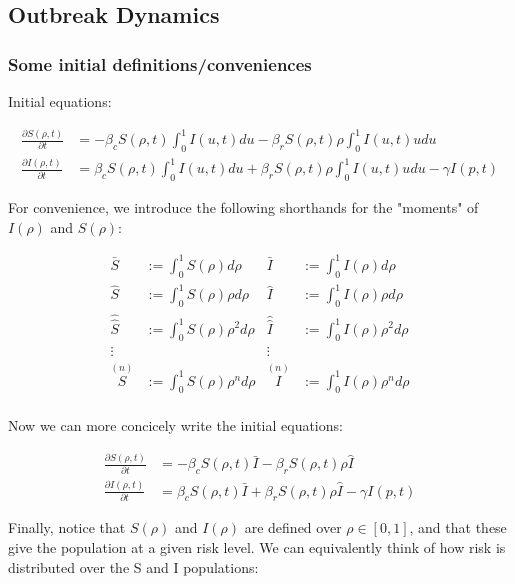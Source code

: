 \documentclass{article}
\begin{document}
{\subsection{Outbreak Dynamics}

\subsubsection{Some initial definitions/conveniences}

Initial equations:


\begin{align*}
\frac{\partial S(\rho, t)}{\partial t} &=
	-\beta_c S(\rho, t) \int_{0}^1 I(u, t) du
	-\beta_r S(\rho, t) \rho \int_{0}^1 I(u, t) u du\\
\frac{\partial I(\rho, t)}{\partial t} &=
	\beta_c S(\rho, t) \int_{0}^1 I(u, t) du
	+ \beta_r S(\rho, t) \rho \int_{0}^1 I(u, t) u du - \gamma I(p, t)
\end{align*}


For convenience, we introduce the following shorthands 
for the "moments" of $I(\rho)$ and $S(\rho)$:


\begin{align*}
\bar S &:= \int_{0}^{1} S(\rho) d\rho
	& \bar I &:= \int_{0}^{1} I(\rho) d\rho\\
\hat S &:= \int_{0}^{1} S(\rho) \rho d\rho
	& \hat I &:= \int_{0}^{1} I(\rho) \rho d\rho\\
\hat{\hat{ S}} &:= \int_{0}^{1} S(\rho) \rho^2 d\rho
	& \hat{\hat{ I}} &:= \int_{0}^{1} I(\rho) \rho^2 d\rho\\
\vdots & & \vdots \\
\overset{(n)}{S} &:= \int_{0}^{1} S(\rho) \rho^n d\rho
	& \overset{(n)}{I} &:= \int_{0}^{1} I(\rho) \rho^n d\rho\\
\end{align*}


Now we can more concicely write the initial equations:


\begin{align*}
\frac{\partial S(\rho, t)}{\partial t} &=
	-\beta_c S(\rho, t) \bar I
	-\beta_r S(\rho, t) \rho \hat I\\
\frac{\partial I(\rho, t)}{\partial t} &=
	\beta_c S(\rho, t) \bar I
	+ \beta_r S(\rho, t) \rho \hat I - \gamma I(p, t)
\end{align*}


Finally, notice that $S(\rho)$ and $I(\rho)$ are defined over $\rho \in [0, 1]$,
and that these give the population at a given risk level. We can equivalently
think of how risk is distributed over the S and I populations:\\

}
\end{document}
